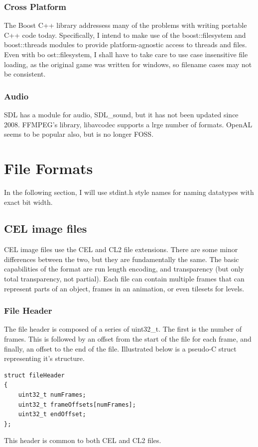 \documentclass[a4paper]{article}
\begin{document}
    	\subsubsection{Cross Platform}
        The Boost C++ library addressess many of the problems with writing portable C++ code today.
        Specifically, I intend to make use of the boost::filesystem and boost::threads modules to provide platform-agnostic access to threads and files.
        Even with bo	ost::filesystem, I shall have to take care to use case insensitive file loading, as the original game was written for windows, so filename cases may not be consistent.
        
        \subsubsection{Audio}
        SDL has a module for audio, SDL\_sound\cite{sdls}, but it has not been updated since 2008.
        FFMPEG's library, libavcodec\cite{libavcodec} supports a lrge number of formats.
        OpenAL seems to be popular also, but is no longer FOSS.
\newpage
\section{File Formats}
In the following section, I will use stdint.h style names for naming datatypes with exact bit width.

\subsection{CEL image files}
	CEL image files use the CEL and CL2 file extensions. There are some minor differences between the two, but they are fundamentally the same. The basic capabilities of the format are run length encoding, and transparency (but only total transparency, not partial). Each file can contain multiple frames that can represent parts of an object, frames in an animation, or even tilesets for levels.

	\subsubsection{File Header}
	\label{sec:fileheaders}
	The file header is composed of a series of uint32\_t. The first is the number of frames. This is followed by an offset from the start of the file for each frame, and finally, an offset to the end of the file. Illustrated below is a pseudo-C struct representing it's structure.
	\begin{lstlisting}
struct fileHeader
{
	uint32_t numFrames;
	uint32_t frameOffsets[numFrames];
	uint32_t endOffset;
};
	\end{lstlisting}
	 This header is common to both CEL and CL2 files.
	 
\end{document}
